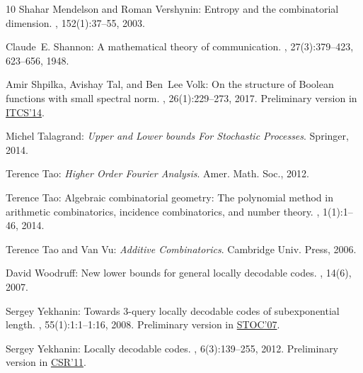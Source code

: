 \documentclass[11pt]{article}
\numberwithin{equation}{section}
\theoremstyle{definition}
\theoremstyle{plain}
\begin{document}
\begin{thebibliography}{10}
{\sc Shahar Mendelson and Roman Vershynin}: Entropy and the combinatorial
  dimension.
, 152(1):37--55, 2003.

{\sc Claude~E. Shannon}: A mathematical theory of communication.
, 27(3):379--423, 623--656, 1948.
\newblock [\epfmtdoi{10.1002/j.1538-7305.1948.tb01338.x}]

{\sc Amir Shpilka, Avishay Tal, and Ben~Lee Volk}: On the structure of
  {B}oolean functions with small spectral norm.
, 26(1):229--273, 2017.
\newblock Preliminary version in
  \href{https://doi.org/10.1145/2554797.2554803}{ITCS'14}.

{\sc Michel Talagrand}: {\em Upper and Lower bounds For Stochastic Processes}.
\newblock Springer, 2014.
\newblock [\epfmtdoi{10.1007/978-3-642-54075-2}]

{\sc Terence Tao}: {\em Higher Order {F}ourier Analysis}.
\newblock Amer. Math. Soc., 2012.

{\sc Terence Tao}: Algebraic combinatorial geometry: {T}he polynomial method in
  arithmetic combinatorics, incidence combinatorics, and number theory.
, 1(1):1--46, 2014.

{\sc Terence Tao and Van Vu}: {\em Additive Combinatorics}.
\newblock Cambridge Univ. Press, 2006.

{\sc David Woodruff}: New lower bounds for general locally decodable codes.
, 14(6), 2007.

{\sc Sergey Yekhanin}: Towards 3-query locally decodable codes of
  subexponential length.
, 55(1):1:1--1:16, 2008.
\newblock Preliminary version in
  \href{https://doi.org/10.1145/1250790.1250830}{STOC'07}.
\newblock [\epfmtdoi{10.1145/1326554.1326555}]

{\sc Sergey Yekhanin}: Locally decodable codes.
, 6(3):139--255, 2012.
\newblock Preliminary version in
  \href{https://link.springer.com/chapter/10.1007/978-3-642-20712-9_22}{CSR'11}.
\newblock [\epfmtdoi{10.1561/0400000030}]

\end{thebibliography}
\end{document}
